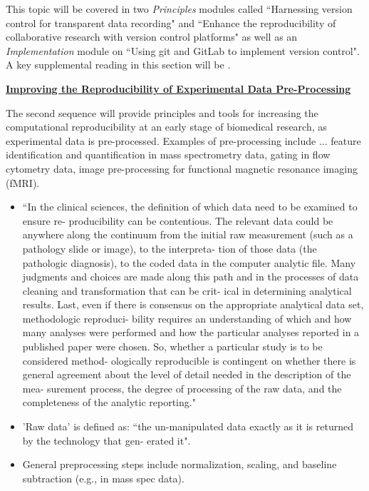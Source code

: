 \documentclass[pdftex,english,11pt,parskip=half]{scrartcl}
\begin{document}
This
topic will be covered in two \textit{Principles} modules called ``Harnessing
version control for transparent data recording" and ``Enhance the
reproducibility of collaborative research with version control platforms" as
well as an \textit{Implementation} module on ``Using git and GitLab to implement
version control". A key supplemental reading in this section will be \cite{bryan2018excuse}.

\underline{\textbf{Improving the Reproducibility of Experimental Data
Pre-Processing}}

The second sequence will provide principles and tools for increasing the
computational reproducibility at an early stage of biomedical research, as
experimental data is pre-processed. Examples of pre-processing include ... feature identification and quantification in mass spectrometry data, gating in flow cytometry data, image pre-processing for functional magnetic resonance imaging (fMRI). 

\begin{itemize}
\item ``In the clinical sciences, the definition of which data need to be examined to ensure re- producibility can be contentious. The relevant data could be anywhere along the continuum from the initial raw measurement (such as a pathology slide or image), to the interpreta- tion of those data (the pathologic diagnosis), to the coded data in the computer analytic file. Many judgments and choices are made along this path and in the processes of data cleaning and transformation that can be crit- ical in determining analytical results. Last, even if there is consensus on the appropriate analytical data set, methodologic reproduci- bility requires an understanding of which and how many analyses were performed and how the particular analyses reported in a published paper were chosen. So, whether a particular study is to be considered method- ologically reproducible is contingent on whether there is general agreement about the level of detail needed in the description of the mea- surement process, the degree of processing of the raw data, and the completeness of the analytic reporting." \cite{goodman2016does}
\item 'Raw data' is defined as: ``the un-manipulated data exactly as it is returned by the technology that gen- erated it". \cite{shade2015computing}
\item General preprocessing steps include normalization, scaling, and baseline subtraction (e.g., in mass spec data).
\end{itemize}
\end{document}
